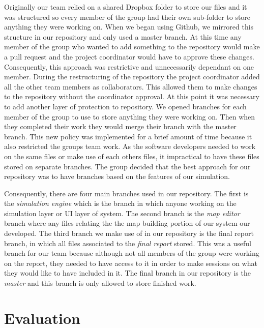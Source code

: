 \documentclass{article}
\begin{document}
	Originally our team relied on a shared Dropbox folder to store our files and it was structured so every member of the group had their own sub-folder to store anything they were working on. When we began using Github, we mirrored this structure in our repository and only used a master branch. At this time any member of the group who wanted to add something to the repository would make a pull request and the project coordinator would have to approve these changes. Consequently, this approach was restrictive and unnecessarily dependant on one member. During the restructuring of the repository the project coordinator added all the other team members as collaborators. This allowed them to make changes to the repository without the coordinator approval. At this point it was necessary to add another layer of protection to repository. We opened branches for each member of the group to use to store anything they were working on. Then when they completed their work they would merge their branch with the master branch. This new policy was implemented for a brief amount of time because it also restricted the groups team work. As the software developers needed to work on the same files or make use of each others files, it impractical to have these files stored on separate branches. The group decided that the best approach for our repository was to have branches based on the features of our simulation. 
	
	Consequently, there are four main branches used in our repository. The first is the \emph{simulation engine} which is the branch in which anyone working on the simulation layer or UI layer of system. The second branch is the \emph{map editor} branch where any files relating the the map building portion of our system our developed. The third branch we make use of in our repository is the final report branch, in which all files associated to the \emph{final report} stored. This was a useful branch for our team because although not all members of the group were working on the report, they needed to have access to it in order to make sessions on what they would like to have included in it.  The final branch in our repository is the \emph{master} and this branch is only allowed to store finished work. 
	
\section{Evaluation}
	
\end{document}
